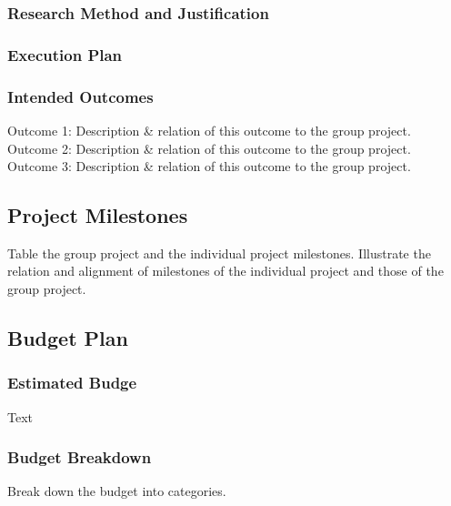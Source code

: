 \documentclass[12pt]{article}
\newenvironment{subs}{\adjustwidth{3em}{0pt}}{\endadjustwidth}
\newenvironment{subsubs}{\adjustwidth{4em}{0pt}}{\endadjustwidth}
\begin{document}
\subsubsection{Research Method and Justification}
\subsubsection{Execution Plan}
\subsubsection{Intended Outcomes}
\begin{subsubs}

Outcome 1: Description \& relation of this outcome to the group project. \\
Outcome 2: Description \& relation of this outcome to the group project. \\
Outcome 3: Description \& relation of this outcome to the group project.

\end{subsubs}


\subsection{Project Milestones}
\begin{subs}
    
Table the group project and the individual project milestones. Illustrate the relation and alignment of milestones of the individual project and those of the group project.

\end{subs}

\subsection{Budget Plan}
\subsubsection{Estimated Budge}
\begin{subsubs}

Text

\end{subsubs}

\subsubsection{Budget Breakdown}
\begin{subsubs}

Break down the budget into categories.

\end{subsubs}
\end{document}
